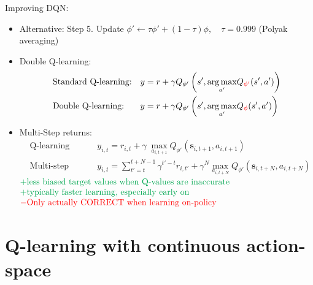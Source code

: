 Improving \ac{DQN}:
\begin{itemize}
	\item Alternative: Step 5. Update $\phi' \leftarrow \tau\phi' + (1-\tau)\phi, \quad \tau = 0.999$ (Polyak averaging)
	\item Double Q-learning: \\
	\begin{align}
		&\text{Standard Q-learning:} && y = r + \gamma Q_{\phi'}\left( s', \underset{a'}{\arg\max} Q_{\color{red} \phi'}(s', a') \right)\\
		&\text{Double Q-learning:} && y = r + \gamma Q_{\phi'}\left( s', \underset{a'}{\arg\max} Q_{\color{red} \phi}(s', a') \right)
	\end{align}
	\item Multi-Step returns:  \cite{munos2016safe}
	\begin{align}
		& \text{Q-learning target:} && y_{i,t} = r_{i,t} + \gamma\; \underset{a_{i, t+1}}{\max} Q_{\phi'}(\textbf{s}_{i, t+1}, a_{i, t+1})\\
		& \text{Multi-step target:} && y_{i,t} = \sum_{t'=t}^{t+N-1} \gamma^{t'-t} r_{i,t'} + \gamma^N \underset{a_{i, t+N}}{\max} Q_{\phi'}(\textbf{s}_{i, t+N}, a_{i, t+N})
	\end{align}
	$\begin{matrix*}[l]
		\color{Green} + \text{less biased target values when Q-values are inaccurate}\\
		\color{Green} + \text{typically faster learning, especially early on}\\
		\color{red} - \text{Only actually CORRECT when learning on-policy}
	\end{matrix*}$
\end{itemize}

\section{Q-learning with continuous action-space}
\todo{}


